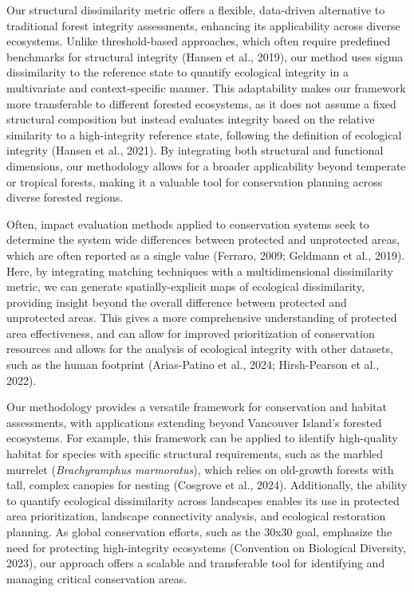 \documentclass[
]{agujournal2019}
\begin{document}
Our structural dissimilarity metric offers a flexible, data-driven
alternative to traditional forest integrity assessments, enhancing its
applicability across diverse ecosystems. Unlike threshold-based
approaches, which often require predefined benchmarks for structural
integrity (Hansen et al., 2019), our method uses sigma dissimilarity to
the reference state to quantify ecological integrity in a multivariate
and context-specific manner. This adaptability makes our framework more
transferable to different forested ecosystems, as it does not assume a
fixed structural composition but instead evaluates integrity based on
the relative similarity to a high-integrity reference state, following
the definition of ecological integrity (Hansen et al., 2021). By
integrating both structural and functional dimensions, our methodology
allows for a broader applicability beyond temperate or tropical forests,
making it a valuable tool for conservation planning across diverse
forested regions.

Often, impact evaluation methods applied to conservation systems seek to
determine the system wide differences between protected and unprotected
areas, which are often reported as a single value (Ferraro, 2009;
Geldmann et al., 2019). Here, by integrating matching techniques with a
multidimensional dissimilarity metric, we can generate
spatially-explicit maps of ecological dissimilarity, providing insight
beyond the overall difference between protected and unprotected areas.
This gives a more comprehensive understanding of protected area
effectiveness, and can allow for improved prioritization of conservation
resources and allows for the analysis of ecological integrity with other
datasets, such as the human footprint (Arias-Patino et al., 2024;
Hirsh-Pearson et al., 2022).

Our methodology provides a versatile framework for conservation and
habitat assessments, with applications extending beyond Vancouver
Island's forested ecosystems. For example, this framework can be applied
to identify high-quality habitat for species with specific structural
requirements, such as the marbled murrelet (\emph{Brachyramphus
marmoratus}), which relies on old-growth forests with tall, complex
canopies for nesting (Cosgrove et al., 2024). Additionally, the ability
to quantify ecological dissimilarity across landscapes enables its use
in protected area prioritization, landscape connectivity analysis, and
ecological restoration planning. As global conservation efforts, such as
the 30x30 goal, emphasize the need for protecting high-integrity
ecosystems (Convention on Biological Diversity, 2023), our approach
offers a scalable and transferable tool for identifying and managing
critical conservation areas.
\end{document}
